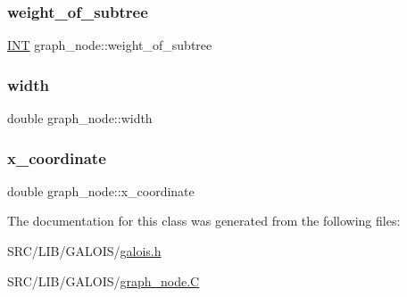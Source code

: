 \subsubsection{\texorpdfstring{weight\+\_\+of\+\_\+subtree}{weight\_of\_subtree}}
{\footnotesize\ttfamily \mbox{\hyperlink{galois_8h_a09fddde158a3a20bd2dcadb609de11dc}{I\+NT}} graph\+\_\+node\+::weight\+\_\+of\+\_\+subtree}

\mbox{\label{classgraph__node_ae07874f8faa7463ce52349c4e48d1d1c}} 
\subsubsection{\texorpdfstring{width}{width}}
{\footnotesize\ttfamily double graph\+\_\+node\+::width}

\mbox{\label{classgraph__node_a6788a7382a4f4f5eecbecff5b4a14a00}} 
\subsubsection{\texorpdfstring{x\+\_\+coordinate}{x\_coordinate}}
{\footnotesize\ttfamily double graph\+\_\+node\+::x\+\_\+coordinate}



The documentation for this class was generated from the following files\+:\begin{DoxyCompactItemize}
\item 
S\+R\+C/\+L\+I\+B/\+G\+A\+L\+O\+I\+S/\mbox{\hyperlink{galois_8h}{galois.\+h}}\item 
S\+R\+C/\+L\+I\+B/\+G\+A\+L\+O\+I\+S/\mbox{\hyperlink{graph__node_8_c}{graph\+\_\+node.\+C}}\end{DoxyCompactItemize}

